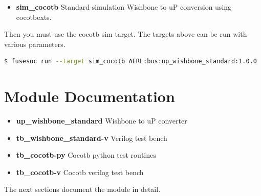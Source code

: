 \begin{itemize}
  \item \textbf{sim\_cocotb} Standard simulation Wishbone to uP conversion using cocotbexts.
\end{itemize}

Then you must use the cocotb sim target. The targets above can be run with various parameters.
\begin{lstlisting}[language=bash]
  $ fusesoc run --target sim_cocotb AFRL:bus:up_wishbone_standard:1.0.0
\end{lstlisting}

\newpage

\section{Module Documentation} \label{Module Documentation}

\par

\begin{itemize}
\item \textbf{up\_wishbone\_standard} Wishbone to uP converter\\
\item \textbf{tb\_wishbone\_standard-v} Verilog test bench\\
\item \textbf{tb\_cocotb-py} Cocotb python test routines\\
\item \textbf{tb\_cocotb-v} Cocotb verilog test bench\\
\end{itemize}
The next sections document the module in detail.


